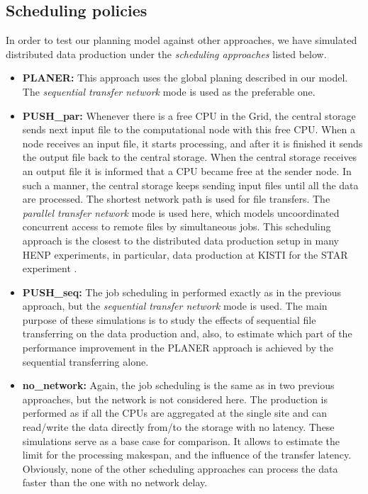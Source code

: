 \documentclass{svjour3}                     %
\begin{document}
\subsection{Scheduling policies}
In order to test our planning model against other approaches, we have simulated distributed data production under the \textit{scheduling approaches} listed below. 
\begin{itemize}
\label{scenarios}
\item \textbf{PLANER:}  This approach uses the global planing described in our model. The \textit{sequential transfer network} mode is used as the preferable one. 
\item \textbf{PUSH\_par:} Whenever there is a free CPU in the Grid, the central storage sends next input file to the computational node with this free CPU. When a node receives an input file, it starts processing, and after it is finished it sends the output file back to the central storage. When the central storage receives an output file it is informed that a CPU became free at the sender node. In such a manner, the central storage keeps sending input files until all the data are processed. The shortest network path is used for file transfers. The \textit{parallel transfer network} mode is used here, which models uncoordinated concurrent access to remote files by simultaneous jobs. This scheduling approach is the closest to the distributed data production setup in many HENP experiments, in particular, data production at KISTI for the STAR experiment \cite{KISTI-production}. 
\item \textbf{PUSH\_seq:} The job scheduling in performed exactly as in the previous approach, but the \textit{sequential transfer network} mode is used. The main purpose of these simulations is to study the effects of sequential file transferring on the data production and, also, to estimate which part of the performance improvement in the PLANER approach is achieved by the sequential transferring alone.
\item \textbf{no\_network:} Again, the job scheduling is the same as in two previous approaches, but the network is not considered here. The production is performed as if all the CPUs are aggregated at the single site and can read/write the data directly from/to the storage with no latency. These simulations serve as a base case for comparison. It allows to estimate the limit for the processing makespan, and the influence of the transfer latency. Obviously, none of the other scheduling approaches can process the data faster than the one with no network delay.
\end{itemize}
\end{document}
